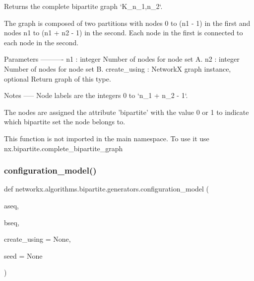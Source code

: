 \begin{DoxyVerb}Returns the complete bipartite graph `K_{n_1,n_2}`.

The graph is composed of two partitions with nodes 0 to (n1 - 1)
in the first and nodes n1 to (n1 + n2 - 1) in the second.
Each node in the first is connected to each node in the second.

Parameters
----------
n1 : integer
   Number of nodes for node set A.
n2 : integer
   Number of nodes for node set B.
create_using : NetworkX graph instance, optional
   Return graph of this type.

Notes
-----
Node labels are the integers 0 to `n_1 + n_2 - 1`.

The nodes are assigned the attribute 'bipartite' with the value 0 or 1
to indicate which bipartite set the node belongs to.

This function is not imported in the main namespace.
To use it use nx.bipartite.complete_bipartite_graph
\end{DoxyVerb}
 \mbox{\label{namespacenetworkx_1_1algorithms_1_1bipartite_1_1generators_a6d634e37c82b2cdc163888bee02b7dff}} 
\subsubsection{\texorpdfstring{configuration\+\_\+model()}{configuration\_model()}}
{\footnotesize\ttfamily def networkx.\+algorithms.\+bipartite.\+generators.\+configuration\+\_\+model (\begin{DoxyParamCaption}\item[{}]{aseq,  }\item[{}]{bseq,  }\item[{}]{create\+\_\+using = {\ttfamily None},  }\item[{}]{seed = {\ttfamily None} }\end{DoxyParamCaption})}

